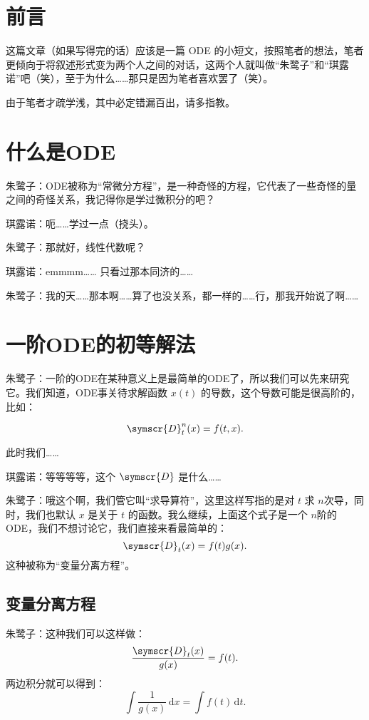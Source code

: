 \documentclass{ctexart}
\begin{document}
\setcounter{section}{-1}

\section*{前言}

这篇文章（如果写得完的话）应该是一篇 ODE 的小短文，按照笔者的想法，笔者更倾向于将叙述形式变为两个人之间的对话，这两个人就叫做“朱鹭子”和“琪露诺”吧（笑），至于为什么……那只是因为笔者喜欢罢了（笑）。

由于笔者才疏学浅，其中必定错漏百出，请多指教。

\newpage
\tableofcontents
\newpage
\phantom{2}
\vspace{2em}
\begin{spacing}{2}
\thispagestyle{empty}
\end{spacing}
\clearpage
\section{什么是ODE}
朱鹭子：ODE被称为“常微分方程”，是一种奇怪的方程，它代表了一些奇怪的量之间的奇怪关系，我记得你是学过微积分的吧？

琪露诺：呃……学过一点（挠头）。

朱鹭子：那就好，线性代数呢？

琪露诺：emmmm…… 只看过那本同济的……

朱鹭子：我的天……那本啊……算了也没关系，都一样的……行，那我开始说了啊……
\section{一阶ODE的初等解法}
朱鹭子：一阶的ODE在某种意义上是最简单的ODE了，所以我们可以先来研究它。我们知道，ODE事关待求解函数 \(x(t)\) 的导数，这个导数可能是很高阶的，比如：

\[
    \symscr{D} ^n_t (x)=f(t,x)
    .\]

此时我们……

琪露诺：等等等等，这个 \(\symscr{D} \) 是什么……

朱鹭子：哦这个啊，我们管它叫“求导算符”，这里这样写指的是对 \( t\) 求 \(n\)次导，同时，我们也默认 \(x\) 是关于 \(t\) 的函数。我么继续，上面这个式子是一个 \(n\)阶的ODE，我们不想讨论它，我们直接来看最简单的：
\[
    \symscr{D} _t (x)=f(t)g(x)
    .\]
这种被称为“变量分离方程”。
\subsection{变量分离方程}
朱鹭子：这种我们可以这样做：
\[
    \frac{\symscr{D} _t(x)}{g(x)}= f(t)
    .\]
两边积分就可以得到：
\[
    \int \frac{1}{g(x)} \,\mathrm{d}x =\int f(t) \,\mathrm{d}t \tag{A}
    .\]
\end{document}
